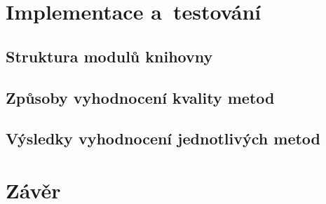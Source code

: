 \blindtext

\blindtext


\chapter{Implementace a~testování}
\label{cha:implementation}


\blindtext

\section{Struktura modulů knihovny}
\label{sec:modules}


\blindtext

\blindtext

\blindtext

\section{Způsoby vyhodnocení kvality metod}
\label{sec:method-quality}


\blindtext

\blindtext

\blindtext

\section{Výsledky vyhodnocení jednotlivých metod}
\label{sec:method-evaluation}


\blindtext

\blindtext

\blindtext


\chapter{Závěr}
\label{cha:conclusion}

\blindtext

\blindtext

\blindtext
